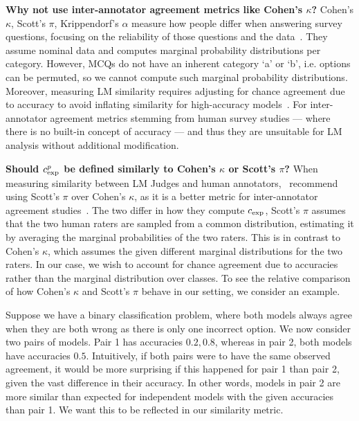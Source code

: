 \textbf{Why not use inter-annotator agreement metrics like Cohen’s $\kappa$?} Cohen’s $\kappa$, Scott's $\pi$, Krippendorf's $\alpha$ measure how people differ when answering survey questions, focusing on the reliability of those questions and the data~\citep{krippendorff2004reliability}. They assume nominal data and computes marginal probability distributions per category. However, MCQs do not have an inherent category `a' or `b', i.e. options can be permuted, so we cannot compute such marginal probability distributions. Moreover, measuring LM similarity requires adjusting for chance agreement due to accuracy to avoid inflating similarity for high-accuracy models~\citep{geirhos2020beyond}. For inter-annotator agreement metrics stemming from human survey studies — where there is no built-in concept of accuracy — and thus they are unsuitable for LM analysis without additional modification.

\textbf{Should $c_{\text{exp}}^{p}$ be defined similarly to Cohen’s $\kappa$ or Scott’s $\pi$?} When measuring similarity between LM Judges and human annotators,~\citet{thakur2024judgingjudgesevaluatingalignment} recommend using Scott’s $\pi$ over Cohen’s $\kappa$, as it is a better metric for inter-annotator agreement studies~\citep{krippendorff2004reliability}. The two differ in how they compute $c_{\text{exp}}$, Scott's $\pi$ assumes that the two human raters are sampled from a common distribution, estimating it by averaging the marginal probabilities of the two raters. This is in contrast to Cohen's $\kappa$, which assumes the given different marginal distributions for the two raters. In our case, we wish to account for chance agreement due to accuracies rather than the marginal distribution over classes. To see the relative comparison of how Cohen's $\kappa$ and Scott's $\pi$ behave in our setting, we consider an example. 

Suppose we have a binary classification problem, where both models always agree when they are both wrong as there is only one incorrect option. We now consider two pairs of models. Pair 1 has accuracies $0.2, 0.8$, whereas in pair 2, both models have accuracies $0.5$. Intuitively, if both pairs were to have the same observed agreement, it would be more surprising if this happened for pair 1 than pair 2, given the vast difference in their accuracy. In other words, models in pair 2 are more similar than expected for independent models with the given accuracies than pair 1. We want this to be reflected in our similarity metric.

